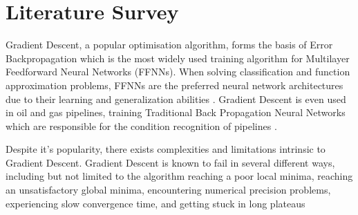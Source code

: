 \documentclass[runningheads,a4paper]{llncs}
\begin{document}
\section{Literature Survey}

Gradient Descent, a popular optimisation algorithm, forms the basis of Error Backpropagation which is 
the most widely used training algorithm for Multilayer Feedforward Neural Networks (FFNNs). 
When solving classification and function approximation problems, FFNNs are the preferred neural network architectures 
due to their learning and generalization abilities \cite{gong2012training}. Gradient Descent is even used in oil and gas pipelines, 
training Traditional Back Propagation Neural Networks which are responsible for the condition recognition of pipelines \cite{laibin2009novel}.

Despite it's popularity, there exists complexities and limitations intrinsic to Gradient Descent. Gradient Descent is known to fail in
several different ways, including but not limited to the algorithm reaching a poor local minima, reaching an unsatisfactory global minima,
encountering numerical precision problems, experiencing slow convergence time, and getting stuck in long plateaus \cite{baldi1995gradient,cetin1993global,laibin2009novel,soni2013performance}
\end{document}
